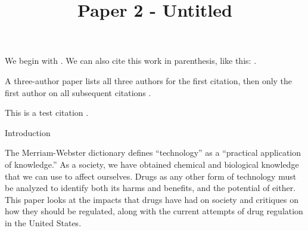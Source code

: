 \documentclass[stu, draftall]{apa7}
\title{Paper 2 - Untitled}
\begin{document}
\maketitle
We begin with \textcite{Shotton1989}.  We can also cite this work in
parenthesis, like this: \parencite{Shotton1989}.

A three-author paper \parencite[e.g.,][]{Lassen2006} lists all
three authors for the first citation, then only the first author
on all subsequent citations \parencite{Lassen2006}.

This is a test citation \parencite{Burris2001}.


\newpage
{\centering Introduction\par}
The Merriam-Webster dictionary defines “technology” as a “practical application of knowledge.” As a society, we have obtained chemical and biological knowledge that we can use to affect ourselves. Drugs as any other form of technology must be analyzed to identify both its harms and benefits, and the potential of either. This paper looks at the impacts that drugs have had on society and critiques on how they should be regulated, along with the current attempts of drug regulation in the United States.


\nocite{*} %
\bfseries
\printbibliography[heading=none]
\normalfont
\end{document}
